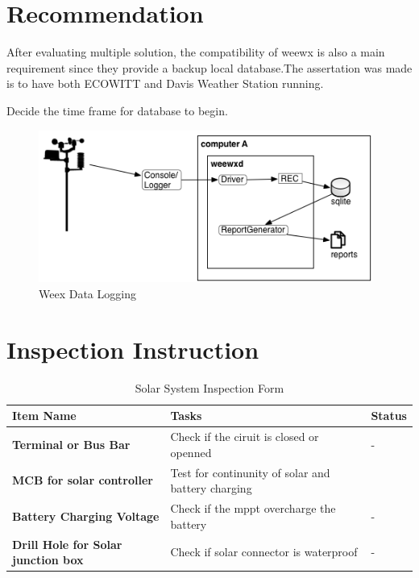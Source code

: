 \documentclass[10pt, a4paper]{article}
\begin{document}
\newpage

\section{Recommendation} %


\par After evaluating multiple solution, the compatibility of weewx is also a main requirement since they provide a backup local database.The assertation was made is to have both ECOWITT and Davis Weather Station running.
\par Decide the time frame for database to begin.
\begin{figure}[!ht]
  \centering
    \includegraphics[width=\textwidth, height=5cm]{weewx-data-logger.png}
  \caption{Weex Data Logging}
\end{figure}





\section{Inspection Instruction}

\begin{table}[!ht]
    \centering
    \begin{tabular}{|l|l|l|}
    \hline
    \textbf{Item Name} & \textbf{Tasks} & \textbf{Status} \\ \hline
        \textbf{Terminal or Bus Bar} & Check if the ciruit is closed or openned & - \\ \hline
        \textbf{MCB for solar controller} & Test for continunity of solar and battery charging  &  \\ \hline
        \textbf{Battery Charging Voltage} & Check if the mppt overcharge the battery & - \\ \hline
        \textbf{Drill Hole for Solar junction box} & Check if solar connector is waterproof  & - \\ \hline
    \end{tabular}
    \caption{Solar System Inspection Form}
\end{table}


% 
\end{document}
